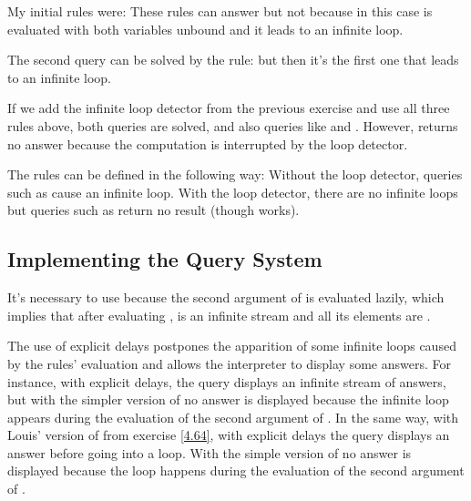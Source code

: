 \begin{exe}[4.68]
    My initial rules were:
    These rules can answer  but not
     because in this case
     is evaluated with both variables 
    unbound and it leads to an infinite loop.

    The second query can be solved by the rule:
    but then it’s the first one that leads to an infinite loop.

    If we add the infinite loop detector from the previous exercise and use all 
    three rules above, both queries are solved, and also queries like
     and
    . However,
     returns no answer because the 
    computation is interrupted by the loop detector.
\end{exe}

\begin{exe}[4.69]
    The rules can be defined in the following way:
    Without the loop detector, queries such as  cause an 
    infinite loop. With the loop detector, there are no infinite loops but 
    queries such as  return no result 
    (though  works).
\end{exe}

\subsection{Implementing the Query System}

\begin{exe}[4.70]
    It’s necessary to use  because the second argument of 
     is evaluated lazily, which implies that after evaluating
    , 
     is an infinite stream and all its elements are 
    .
\end{exe}

\begin{exe}[4.71]
    The use of explicit delays postpones the apparition of some infinite loops 
    caused by the rules’ evaluation and allows the interpreter to display some 
    answers. For instance, with explicit delays, the query
     displays an infinite stream of answers, but 
    with the simpler version of  no answer is displayed 
    because the infinite loop appears during the evaluation of the second 
    argument of . In the same way, with Louis’ version of 
     from exercise \ref{4.64}, with explicit delays the query
     displays an answer before going 
    into a loop. With the simple version of  no answer is 
    displayed because the loop happens during the evaluation of the second 
    argument of .
\end{exe}

